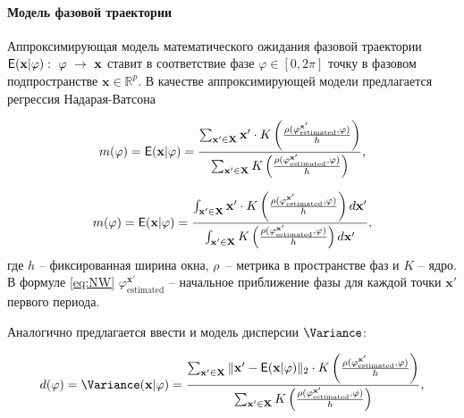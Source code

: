 \documentclass[12pt, twoside]{article}
\theoremstyle{definition}
\def\RR{\mathbb R}
\begin{document}
\paragraph{Модель фазовой траектории} \label{subsection:4.1}
Аппроксимирующая модель математического ожидания фазовой траектории $\mathsf{E}(\mathbf{x}|\varphi):~\varphi~\rightarrow~\mathbf{x}$ ставит в соответствие фазе $\varphi \in [0, 2\pi]$ точку в фазовом подпространстве $ \mathbf{x}\in\RR^p$. 
В качестве аппроксимирующей модели предлагается регрессия Надарая-Ватсона

\begin{equation}           
    m(\varphi) = \Expect(\mathbf{x}|\varphi) =
        \frac{\sum_{\mathbf{x'}\in \mathbf{X}}  \mathbf{x'} \cdot K\left(\frac{\rho(\varphi^{\mathbf{x'}}_{\text{estimated}}, \varphi)}{h}\right)}
        {\sum_{\mathbf{x'}\in \mathbf{X}} K\left(\frac{\rho(\varphi^{\mathbf{x'}}_{\text{estimated}}, \varphi)}{h}\right)},
\label{eq:NW} 
\end{equation}

\begin{equation}           
    m(\varphi) = \Expect(\mathbf{x}|\varphi) =
        \frac{\int_{\mathbf{x'}\in \mathbf{X}}  \mathbf{x'} \cdot K\left(\frac{\rho(\varphi^{\mathbf{x'}}_{\text{estimated}}, \varphi)}{h}\right) d\mathbf{x'}}
        {\int_{\mathbf{x'}\in \mathbf{X}} K\left(\frac{\rho(\varphi^{\mathbf{x'}}_{\text{estimated}}, \varphi)}{h}\right) d\mathbf{x'}},
\label{eq:NW2} 
\end{equation}
где $h$ -- фиксированная ширина окна, $\rho$~-- метрика в пространстве фаз и $K$ -- ядро.
В формуле \eqref{eq:NW} $\varphi^{\mathbf{x'}}_{\text{estimated}}$ -- начальное приближение фазы для каждой точки $\mathbf{x'}$ первого периода.

Аналогично предлагается ввести и модель дисперсии $\Variance$:

\begin{equation}           
    d(\varphi) = \Variance(\mathbf{x}|\varphi) =
        \frac{
        \sum_{\mathbf{x'}\in \mathbf{X}}  \|\mathbf{x'} - \Expect(\mathbf{x}|\varphi)\|_2
        \cdot
        K\left(\frac{\rho(\varphi^{\mathbf{x'}}_{\text{estimated}}, \varphi)}{h}\right)
        }
        {\sum_{\mathbf{x'}\in \mathbf{X}} K\left(\frac{\rho(\varphi^{\mathbf{x'}}_{\text{estimated}}, \varphi)}{h}\right)
        },
\label{eq:NW3} 
\end{equation}
\end{document}
